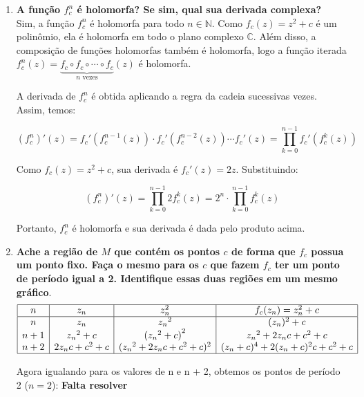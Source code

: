 \begin{enumerate}[label=(\alph*)]
    \item \textbf{A função \( f_c^n \) é holomorfa? Se sim, qual sua derivada complexa?} \\
    
         Sim, a função \( f_c^n \) é holomorfa para todo \( n \in \mathbb{N} \). Como \( f_c(z) = z^2 + c \) é um polinômio, ela é holomorfa em todo o plano complexo \( \mathbb{C} \). Além disso, a composição de funções holomorfas também é holomorfa, logo a função iterada \( f_c^n(z) = \underbrace{f_c \circ f_c \circ \cdots \circ f_c}_{n \text{ vezes}}(z) \) é holomorfa.

        A derivada de \( f_c^n \) é obtida aplicando a regra da cadeia sucessivas vezes. Assim, temos:

        \[
        (f_c^n)'(z) = f_c'(f_c^{n-1}(z)) \cdot f_c'(f_c^{n-2}(z)) \cdots f_c'(z) = \prod_{k=0}^{n-1} f_c'(f_c^k(z))
        \]

        Como \( f_c(z) = z^2 + c \), sua derivada é \( f_c'(z) = 2z \). Substituindo:

        \[
        (f_c^n)'(z) = \prod_{k=0}^{n-1} 2 f_c^k(z) = 2^n \cdot \prod_{k=0}^{n-1} f_c^k(z)
        \]

        Portanto, \( f_c^n \) é holomorfa e sua derivada é dada pelo produto acima.


    \item \textbf{Ache a região de \( M \) que contém os pontos \( c \) de forma que \( f_c \) possua um ponto fixo. Faça o mesmo para os \( c \) que fazem \( f_c \) ter um ponto de período igual a 2. Identifique essas duas regiões em um mesmo gráfico}. \\
    
        \[
        \begin{array}{|c|c|c|c|}
        \hline
        n & z_n & z_n^2 & f_c(z_n) = z_n^2 + c \\
        \hline
        n & z_n & {z_n}^2 & ({z_n})^2 + c \\
        n + 1 & {z_n}^2 + c & {({z_n}^2 + c)}^2 & {z_n}^2  + 2 z_n c + c^2 + c \\
        n + 2 & 2 z_n c + c^2 + c & ({z_n}^2+ 2 z_n c + c^2 + c)^2 & (z_n + c)^4 + 2(z_n + c)^2 c + c^2 + c\\      \hline
        \end{array}
        \]

        Agora igualando para os valores de n e n + 2, obtemos os pontos de período 2 (\( n = 2 \)):
           \textbf{\color{red}Falta resolver}



\end{enumerate}
